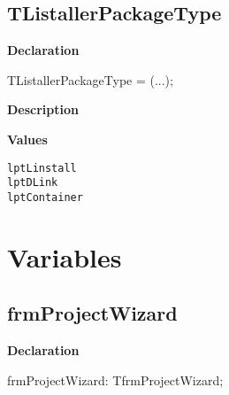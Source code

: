 \documentclass{report}
\newif\ifpdf
\begin{document}
\subsection*{TListallerPackageType}
\fi
\label{prjwizard-TListallerPackageType}
\begin{list}{}{
\setlength{\itemindent}{0cm}
\setlength{\listparindent}{0cm}
\setlength{\leftmargin}{\evensidemargin}
\addtolength{\leftmargin}{\tmplength}
\settowidth{\labelsep}{X}
\addtolength{\leftmargin}{\labelsep}
\setlength{\labelwidth}{\tmplength}
}
\item[\textbf{Declaration}\hfill]
\ifpdf
\begin{flushleft}
\fi
\begin{ttfamily}
TListallerPackageType = (...);\end{ttfamily}

\ifpdf
\end{flushleft}
\fi

\par
\item[\textbf{Description}]
 \item[\textbf{Values}]
\begin{description}
\item[\texttt{lptLinstall}]  
\item[\texttt{lptDLink}]  
\item[\texttt{lptContainer}]  
\end{description}


\end{list}
\section{Variables}
\ifpdf
\subsection*{\large{\textbf{frmProjectWizard}}\normalsize\hspace{1ex}\hrulefill}
\else
\subsection*{frmProjectWizard}
\fi
\label{prjwizard-frmProjectWizard}
\begin{list}{}{
\setlength{\itemindent}{0cm}
\setlength{\listparindent}{0cm}
\setlength{\leftmargin}{\evensidemargin}
\addtolength{\leftmargin}{\tmplength}
\settowidth{\labelsep}{X}
\addtolength{\leftmargin}{\labelsep}
\setlength{\labelwidth}{\tmplength}
}
\item[\textbf{Declaration}\hfill]
\ifpdf
\begin{flushleft}
\fi
\begin{ttfamily}
frmProjectWizard: TfrmProjectWizard;\end{ttfamily}

\ifpdf
\end{flushleft}
\fi

\end{list}
\ifpdf
\end{document}
